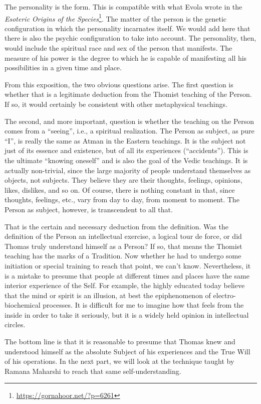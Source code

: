 The personality is the form. This is compatible with what Evola wrote in the \textit{Esoteric Origins of the Species}\footnote{\url{https://gornahoor.net/?p=6261}}. The matter of the person is the genetic configuration in which the personality incarnates itself. We would add here that there is also the psychic configuration to take into account. The personality, then, would include the spiritual race and sex of the person that manifests. The measure of his power is the degree to which he is capable of manifesting all his possibilities in a given time and place.

From this exposition, the two obvious questions arise. The first question is whether that is a legitimate deduction from the Thomist teaching of the Person. If so, it would certainly be consistent with other metaphysical teachings.

The second, and more important, question is whether the teaching on the Person comes from a ``seeing'', i.e., a spiritual realization. The Person as subject, as pure ``I'', is really the same as Atman in the Eastern teachings. It is the subject not just of its essence and existence, but of all its experiences (``accidents''). This is the ultimate ``knowing oneself'' and is also the goal of the Vedic teachings. It is actually non-trivial, since the large majority of people understand themselves as objects, not subjects. They believe they are their thoughts, feelings, opinions, likes, dislikes, and so on. Of course, there is nothing constant in that, since thoughts, feelings, etc., vary from day to day, from moment to moment. The Person as subject, however, is transcendent to all that.

That is the certain and necessary deduction from the definition. Was the definition of the Person an intellectual exercise, a logical tour de force, or did Thomas truly understand himself as a Person? If so, that means the Thomist teaching has the marks of a Tradition. Now whether he had to undergo some initiation or special training to reach that point, we can't know. Nevertheless, it is a mistake to presume that people at different times and places have the same interior experience of the Self. For example, the highly educated today believe that the mind or spirit is an illusion, at best the epiphenomenon of electro-biochemical processes. It is difficult for me to imagine how that feels from the inside in order to take it seriously, but it is a widely held opinion in intellectual circles.

The bottom line is that it is reasonable to presume that Thomas knew and understood himself as the absolute Subject of his experiences and the True Will of his operations. In the next part, we will look at the technique taught by Ramana Maharshi to reach that same self-understanding.

